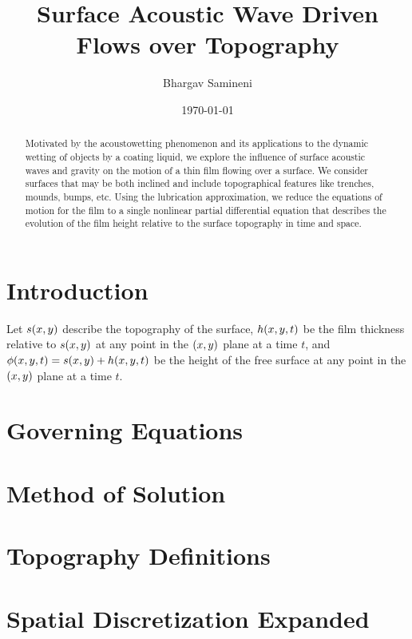 \documentclass[letterpaper]{article}
\title{Surface Acoustic Wave Driven Flows over Topography}
\author{Bhargav Samineni}
\date{\today}
\begin{document}
 
\maketitle

\begin{abstract}
    Motivated by the acoustowetting phenomenon and its applications to the dynamic wetting 
    of objects by a coating liquid, we explore the influence of surface acoustic waves and gravity on the motion of a thin film
    flowing over a surface. We consider surfaces that may be both inclined and include topographical features like trenches, mounds, bumps, etc. 
    Using the lubrication approximation, we reduce the equations of motion for the film
    to a single nonlinear partial differential equation that describes the evolution of the film height relative to the 
    surface topography in time and space. 
\end{abstract}

\tableofcontents

\section{Introduction}

Let $s\!\left( x, y \right)$ describe the topography of the surface, 
$h\!\left( x,y,t \right)$ be the film thickness relative to $s\!\left( x,y \right)$ at any point in the $\left( x,y \right)$ plane at a time $t$, 
and $\phi\!\left( x,y,t \right) = s\!\left( x,y \right) + h\!\left( x,y,t \right)$ be the height of the free surface at any point in the $\left( x,y \right)$ plane at a time $t$.

\section{Governing Equations} \label{sec:gov_eqs}

 
\section{Method of Solution} \label{sec:method_of_sol}


 
\newpage
\begin{appendices}
    \section{Topography Definitions} \label{sec:topography}

    \section{Spatial Discretization Expanded}\label{sec:space_discrete_expand}
    
\end{appendices}

\newpage
\printbibliography
\end{document}
